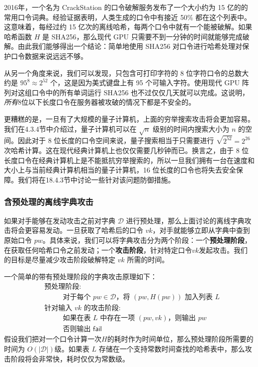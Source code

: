 \begin{snote}[口令统计.]
2016年，一个名为 CrackStation 的口令破解服务发布了一个大小约为 15 亿的的常用口令词典。经验证据表明，人类生成的口令中有接近 50\% 都在这个列表中。这意味着，每经过约 15 亿次的离线哈希，每两个口令中就有一个能被破解。如果哈希函数 $H$ 是 SHA256，那么现代 GPU 只需要不到一分钟的时间就能够完成破解。由此我们能够得出一个结论：简单地使用 SHA256 对口令进行哈希处理对保护口令数据来说远远不够。

从另一个角度来说，我们可以发现，只包含可打印字符的 8 位字符口令的总数大约是 $95^8 \approx 2^{52}$ 个，这是因为美式键盘上有 95 个可输入字符。使用现代 GPU 阵列对这组口令中的所有单词运行 SHA256 也不过仅仅几天就可以完成。这说明，\emph{所有}8位以下长度口令在服务器被攻破的情况下都是不安全的。
\end{snote}

\begin{snote}[量子离线口令攻击.]
更糟糕的是，一旦有了大规模的量子计算机，上面的穷举搜索攻击将会更加容易。我们在4.3.4节中介绍过，量子计算机可以在 $\sqrt{n}$ 级别的时间内搜索大小为 $n$ 的空间。因此对于 8 位长度的口令空间来说，量子搜索相当于只需要进行 $\sqrt{2^{52}}=2^{26}$ 次哈希计算。这在现代经典计算机上也仅仅需要几秒钟而已。换言之，由于 8 位长度口令在经典计算机上是不能抵抗穷举搜索的，所以一旦我们拥有一台在速度和大小上与当前经典计算机相当的量子计算机，16 位长度的口令也将失去安全保障。我们将在18.4.3节中讨论一些针对该问题防御措施。
\end{snote}

\subsubsection{含预处理的离线字典攻击}

如果对手能够在发动攻击之前对字典 $\mathcal{D}$ 进行预处理，那么上面讨论的离线字典攻击将会更容易发动。一旦获取了哈希后的口令 $vk$，对手就能够立即从字典中查到原始口令 $pw$。具体来说，我们可以将字典攻击分为两个阶段：一个\textbf{预处理阶段}，在获取任何哈希口令之前发动；一个\textbf{攻击阶段}，针对特定口令$vk$发起攻击。我们的目标是尽量减少攻击阶段破解特定 $vk$ 所需的时间。

一个简单的带有预处理阶段的字典攻击原理如下：
\begin{equation}\label{eq:18-2}
	\begin{aligned}
		& \text{预处理阶段}:\\
		& \text{~~~~~~~~对于每个~}pw\in\mathcal{D}\text{，将~}(pw,H(pw))\text{~加入列表~}L\\
		& \text{针对输入~}vk\text{~的攻击阶段}:\\
		& \text{~~~~~~~~如果在表~}L\text{~中存在一项~}(pw,vk)\text{，则输出~}pw\\
		& \text{~~~~~~~~否则输出~}\mathsf{fail}
	\end{aligned}
\end{equation}
假设我们把对一个口令计算一次$H$的耗时作为时间单位，那么预处理阶段所需要的时间为 $O(|\mathcal{D}|)$级。如果表 $L$ 存储在一个支持常数时间查找的哈希表中，那么攻击阶段将会非常快，耗时仅仅为常数级。

